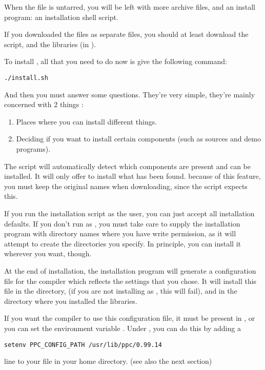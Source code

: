 \documentclass{report}
\begin{document}
When the file is untarred, you will be left with more archive files, and
an install program: an installation shell script.

If you downloaded the files as separate files, you should at least download
the  script, and the libraries (in ).

To install \fpc, all that you need to do now is give the following command:
\begin{verbatim}
./install.sh
\end{verbatim}
And then you must answer some questions. They're very simple, they're
mainly concerned with 2 things :
\begin{enumerate}
\item Places where you can install different things.
\item Deciding if you want to install certain components (such as sources
and demo programs).
\end{enumerate}
The script will automatically detect which components are present and can be
installed. It will only offer to install what has been found.
because of this feature, you must keep the original names when downloading,
since the script expects this.

If you run the installation script as the  user, you can just accept all installation
defaults. If you don't run as , you must take care to supply the
installation program with directory names where you have write permission,
as it will attempt to create the directories you specify.
In principle, you can install it wherever you want, though.

At the end of installation, the installation program will generate a
configuration file for the \fpc compiler which reflects the settings
that you chose. It will install this file in the  directory, (if
you are not installing as , this will fail), and in the
directory where you installed the libraries.

If you want the \fpc compiler to use this configuration file, it must be
present in , or you can set the environment variable
. Under , you can do this by adding  a
\begin{verbatim}
setenv PPC_CONFIG_PATH /usr/lib/ppc/0.99.14
\end{verbatim}
line to your  file in your home directory.
(see also the next section)
\end{document}
